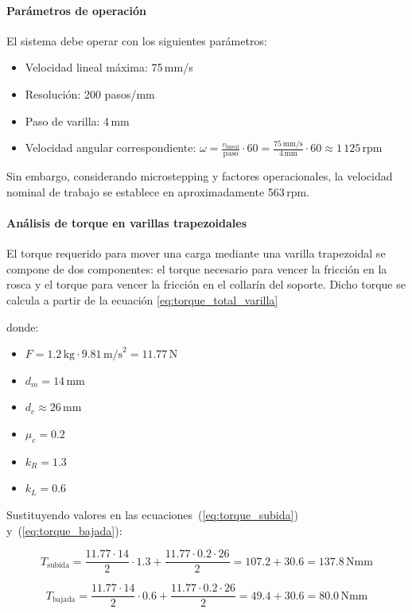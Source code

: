 \paragraph{Parámetros de operación}
El sistema debe operar con los siguientes parámetros:
\begin{itemize}
    \item Velocidad lineal máxima: 75\,mm/s
    \item Resolución: 200 pasos/mm
    \item Paso de varilla: 4\,mm
    \item Velocidad angular correspondiente: $\omega = \frac{v_{\text{lineal}}}{\text{paso}} \cdot 60 = \frac{75\,\text{mm/s}}{4\,\text{mm}} \cdot 60 \approx 1\,125$\,rpm
\end{itemize}

Sin embargo, considerando microstepping y factores operacionales, la velocidad nominal de trabajo se establece en aproximadamente 563\,rpm.

\paragraph{Análisis de torque en varillas trapezoidales}
El torque requerido para mover una carga mediante una varilla trapezoidal se compone de dos componentes: el torque necesario para vencer la fricción en la rosca y el torque para vencer la fricción en el collarín del soporte. Dicho torque se calcula a partir de la ecuación \ref{eq:torque_total_varilla}

donde:
\begin{itemize}
    \item $F = 1.2\,\text{kg} \cdot 9.81\,\text{m/s}^2 = 11.77$\,N
    \item $d_m = 14$\,mm 
    \item $d_c \approx 26$\,mm
    \item $\mu_c = 0.2$ 
    \item $k_R = 1.3$ 
    \item $k_L = 0.6$ 
\end{itemize}

Sustituyendo valores en las ecuaciones~(\ref{eq:torque_subida}) y~(\ref{eq:torque_bajada}):

\[T_{\text{subida}} = \frac{11.77 \cdot 14}{2} \cdot 1.3 + \frac{11.77 \cdot 0.2 \cdot 26}{2} = 107.2 + 30.6 = 137.8\,\text{Nmm}\]

\[T_{\text{bajada}} = \frac{11.77 \cdot 14}{2} \cdot 0.6 + \frac{11.77 \cdot 0.2 \cdot 26}{2} = 49.4 + 30.6 = 80.0\,\text{Nmm}\]

